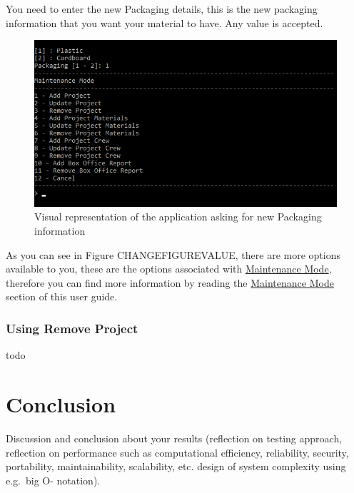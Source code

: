 \documentclass[
  english,
  a4paper,
,tablecaptionabove
]{scrartcl}
\begin{document}
You need to enter the new Packaging details, this is the new packaging
information that you want your material to have. Any value is accepted.

\begin{figure}
\centering
\includegraphics{images/user-guide/maintenance-mode/update-project-material-packaging.png}
\caption{Visual representation of the application asking for new
Packaging information}
\end{figure}

As you can see in Figure CHANGEFIGUREVALUE, there are more options
available to you, these are the options associated with
\protect\hyperlink{using-maintenance-mode}{Maintenance Mode}, therefore
you can find more information by reading the
\protect\hyperlink{using-maintenance-mode}{Maintenance Mode} section of
this user guide.

\newpage

\hypertarget{using-remove-project}{%
\subsubsection{Using Remove Project}\label{using-remove-project}}

todo

\newpage

\hypertarget{conclusion}{%
\section{Conclusion}\label{conclusion}}

Discussion and conclusion about your results (reflection on testing
approach, reflection on performance such as computational efficiency,
reliability, security, portability, maintainability, scalability, etc.
design of system complexity using e.g.~big O- notation).
\end{document}
